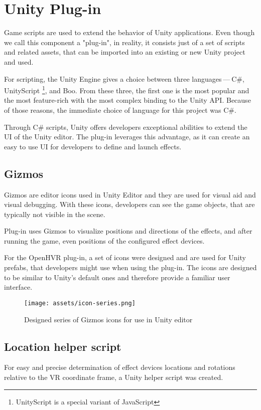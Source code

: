 \hypertarget{x-unity-plug-in}{\section{Unity Plug-in}}
Game scripts are used to extend the behavior of Unity applications. Even though
we call this component a "plug-in", in reality, it consists just of a
set of scripts and related assets, that can be imported into an existing
or new Unity project and used.


For scripting, the Unity Engine gives a choice between three languages — C\#, UnityScript \footnote{UnityScript is a special variant of JavaScript}, and
Boo. From these three, the first one is the most popular and the most
feature-rich with the most complex binding to the Unity API. \cite{unityblog}
Because of those reasons, the immediate choice of language for this
project was C\#.


Through C\# scripts, Unity offers developers exceptional abilities to extend
the UI of the Unity editor. The plug-in leverages this advantage, as it can
create an easy to use UI for developers to define and launch effects.


\hypertarget{x-gizmos}{\subsection{Gizmos}}
Gizmos are editor icons used in Unity Editor and they are used for
visual aid and visual debugging. \cite{gizmos}
With these icons, developers can see the game objects, that are
typically not visible in the scene.


Plug-in uses Gizmos to visualize positions and directions of the
effects, and after running the game, even positions of the configured
effect devices.


For the OpenHVR plug-in, a set of icons were designed and are used for
Unity prefabs, that developers might use when using the plug-in. The icons
are designed to be similar to Unity’s default ones and therefore provide
a familiar user interface.


\begin{figure}[h]{}
\centering\texttt{[image: assets/icon-series.png]}
\caption{Designed series of Gizmos icons for use in Unity editor}

\end{figure}

\hypertarget{x-location-helper-script}{\subsection{Location helper script}}
For easy and precise determination of effect devices locations and rotations
relative to the VR coordinate frame, a Unity helper script was created.


